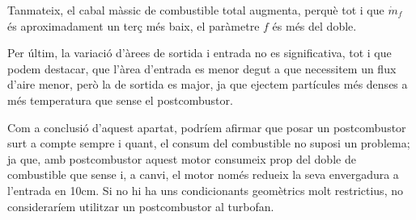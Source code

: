 \noindent Tanmateix, el cabal màssic de combustible total augmenta, perquè tot i que $ \dot{m}_f$ és aproximadament un terç més baix, el paràmetre $ f$ és més del doble.

\noindent Per últim, la variació d'àrees de sortida i entrada no es significativa, tot i que podem destacar, que l'àrea d'entrada es menor degut a que necessitem un flux d'aire menor, però la de sortida es major, ja que ejectem partícules més denses a més temperatura que sense el postcombustor.

\noindent Com a conclusió d'aquest apartat, podríem afirmar que posar un postcombustor surt a compte sempre i quant, el consum del combustible no suposi un problema; ja que, amb postcombustor aquest motor consumeix prop del doble de combustible que sense i, a canvi, el motor només redueix la seva envergadura a l'entrada en 10cm. Si no hi ha uns condicionants geomètrics molt restrictius, no consideraríem utilitzar un postcombustor al turbofan. 


\clearpage

